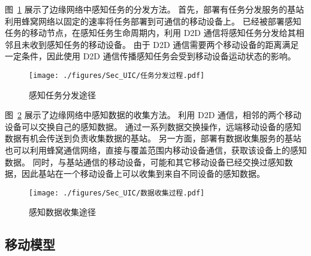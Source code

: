 图~\ref{Figure_PropagationProcedure} 展示了边缘网络中感知任务的分发方法。
首先，部署有任务分发服务的基站利用蜂窝网络以固定的速率将任务部署到可通信的移动设备上。
已经被部署感知任务的移动节点，在感知任务生命周期内，利用 D2D 通信将感知任务分发给其相邻且未收到感知任务的移动设备。
由于 D2D 通信需要两个移动设备的距离满足一定条件，因此使用 D2D 通信传播感知任务会受到移动设备运动状态的影响。

\begin{figure}[!h]
  \centering
  \texttt{[image: ./figures/Sec\_UIC/任务分发过程.pdf]}
  \vspace{-0.5em}
  \caption{感知任务分发途径}
  \vspace{-1em}
  \label{Figure_PropagationProcedure}
\end{figure}

图~\ref{Figure_FeedbacksCollection} 展示了边缘网络中感知数据的收集方法。
利用 D2D 通信，相邻的两个移动设备可以交换自己的感知数据。
通过一系列数据交换操作，远端移动设备的感知数据有机会传送到负责收集数据的基站。
另一方面，部署有数据收集服务的基站也可以利用蜂窝通信网络，直接与覆盖范围内移动设备通信，获取该设备上的感知数据。
同时，与基站通信的移动设备，可能和其它移动设备已经交换过感知数据，因此基站在一个移动设备上可以收集到来自不同设备的感知数据。


\begin{figure}[!h]
  \centering
  \texttt{[image: ./figures/Sec\_UIC/数据收集过程.pdf]}
  \vspace{-0.5em}
  \caption{感知数据收集途径}
  \vspace{-1.5em}
  \label{Figure_FeedbacksCollection}
\end{figure}

\subsection{移动模型}

